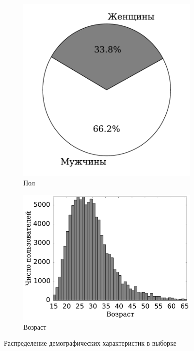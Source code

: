\documentclass{spisok-article}
\begin{document}
\begin{figure}[h!]
\centering
\begin{subfigure}[а]{0.42\textwidth}
    \includegraphics[width=\textwidth]{figures/gender-pie.pdf}
    \caption{Пол}
    \label{fig:gender}
\end{subfigure}
\begin{subfigure}[б]{0.57\textwidth}
    \includegraphics[width=\textwidth]{figures/age-histogram.pdf}
    \caption{Возраст}
    \label{fig:age}
\end{subfigure}
\caption{Распределение демографических характеристик в выборке}
\end{figure}
\end{document}
